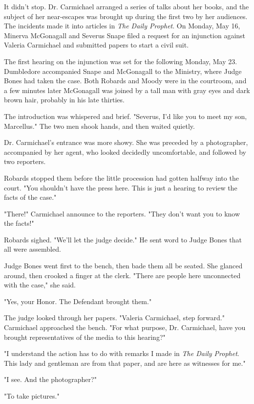 \documentclass[a4paper,11pt]{article}
\begin{document}
It didn't stop. Dr. Carmichael arranged a series of talks about her books, and the subject of her near-escapes was brought up during the first two by her audiences. The incidents made it into articles in \emph{The Daily Prophet}. On Monday, May 16, Minerva McGonagall and Severus Snape filed a request for an injunction against Valeria Carmichael and submitted papers to start a civil suit.

The first hearing on the injunction was set for the following Monday, May 23. Dumbledore accompanied Snape and McGonagall to the Ministry, where Judge Bones had taken the case. Both Robards and Moody were in the courtroom, and a few minutes later McGonagall was joined by a tall man with gray eyes and dark brown hair, probably in his late thirties.

The introduction was whispered and brief. "Severus, I'd like you to meet my son, Marcellus." The two men shook hands, and then waited quietly.

Dr. Carmichael's entrance was more showy. She was preceded by a photographer, accompanied by her agent, who looked decidedly uncomfortable, and followed by two reporters.

Robards stopped them before the little procession had gotten halfway into the court. "You shouldn't have the press here. This is just a hearing to review the facts of the case."

"There!" Carmichael announce to the reporters. "They don't want you to know the facts!"

Robards sighed. "We'll let the judge decide." He sent word to Judge Bones that all were assembled.

Judge Bones went first to the bench, then bade them all be seated. She glanced around, then crooked a finger at the clerk. "There are people here unconnected with the case," she said.

"Yes, your Honor. The Defendant brought them."

The judge looked through her papers. "Valeria Carmichael, step forward." Carmichael approached the bench. "For what purpose, Dr. Carmichael, have you brought representatives of the media to this hearing?"

"I understand the action has to do with remarks I made in \emph{The Daily Prophet}. This lady and gentleman are from that paper, and are here as witnesses for me."

"I see. And the photographer?"

"To take pictures."
\end{document}
